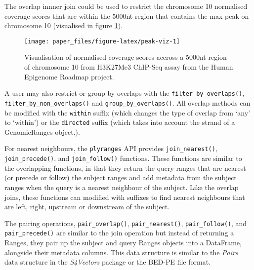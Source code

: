 \documentclass[10pt,letterpaper]{article}
\newenvironment{Shaded}{\begin{snugshade}}{\end{snugshade}}
\newcommand{\KeywordTok}[1]{\textcolor[rgb]{0.13,0.29,0.53}{\textbf{#1}}}
\newcommand{\NormalTok}[1]{#1}
\newcommand{\OperatorTok}[1]{\textcolor[rgb]{0.81,0.36,0.00}{\textbf{#1}}}
\newcommand{\StringTok}[1]{\textcolor[rgb]{0.31,0.60,0.02}{#1}}
\begin{document}
The overlap innner join could be used to restrict the chromosome 10
normalised coverage scores that are within the 5000nt region that
contains the max peak on chromosome 10 (visualised in figure
\ref{fig:peak-viz}).

\begin{Shaded}
\end{Shaded}

\begin{figure}

{\centering \texttt{[image: paper\_files/figure-latex/peak-viz-1]} 

}

\caption{Visualisation of normalised coverage scores accross a 5000nt region of chromosome 10 from H3K27Me3 ChIP-Seq assay from the Human Epigenome Roadmap project.}\label{fig:peak-viz}
\end{figure}

A user may also restrict or group by overlaps with the
\texttt{filter\_by\_overlaps()}, \texttt{filter\_by\_non\_overlaps()}
and \texttt{group\_by\_overlaps()}. All overlap methods can be modified
with the \texttt{within} suffix (which changes the type of overlap from
`any' to `within') or the \texttt{directed} suffix (which takes into
account the strand of a GenomicRanges object.).

For nearest neighbours, the \texttt{plyranges} API provides
\texttt{join\_nearest()}, \texttt{join\_precede()}, and
\texttt{join\_follow()} functions. These functions are similar to the
overlapping functions, in that they return the query ranges that are
nearest (or precede or follow) the subject ranges and add metadata from
the subject ranges when the query is a nearest neighbour of the subject.
Like the overlap joins, these functions can modified with suffixes to
find nearest neighbours that are left, right, upstream or downstream of
the subject.

The pairing operations, \texttt{pair\_overlap()},
\texttt{pair\_nearest()}, \texttt{pair\_follow()}, and
\texttt{pair\_precede()} are similar to the join operation but instead
of returning a Ranges, they pair up the subject and query Ranges objects
into a DataFrame, alongside their metadata columns. This data structure
is similar to the \emph{Pairs} data structure in the \emph{S4Vectors}
package or the BED-PE file format.
\end{document}
